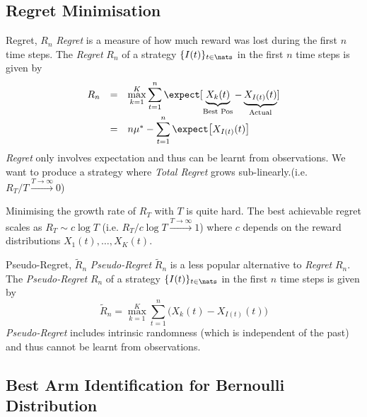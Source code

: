\documentclass[11pt,a4paper]{article}
\begin{document}
\subsection{Regret Minimisation}

  \begin{definition}{Regret, $R_n$}
    \textit{Regret} is a measure of how much reward was lost during the first $n$ time steps. The \textit{Regret} $R_n$ of a strategy $\{I(t)\}_{t\in\nats}$ in the first $n$ time steps is given by
    \[\begin{array}{rcl}
      R_n&=&{\displaystyle \max\limits_{k=1}^K\sum_{t=1}^n \expect[\underbrace{X_k(t)}_\text{Best Pos}-\underbrace{X_{I(t)}(t)}_\text{Actual}]}\\
      &=&n\mu^*-{\displaystyle\sum_{t=1}^n\expect\big[X_{I(t)}(t)\big]}
    \end{array}\]
    \textit{Regret} only involves expectation and thus can be learnt from observations. We want to produce a strategy where \textit{Total Regret} grows sub-linearly.(i.e. $R_T/T\overset{T\to\infty}\longrightarrow0$)
  \end{definition}

  \begin{remark}{Minimising the growth rate of $R_T$ with $T$ is quite hard.}
    The best achievable regret scales as $R_T\sim c\log T$ (i.e. $R_T/c\log T\overset{T\to\infty}\longrightarrow1$) where $c$ depends on the reward distributions $X_1(t),\dots,X_K(t)$.
  \end{remark}

  \begin{definition}{Pseudo-Regret, $\tilde{R}_n$}
    \textit{Pseudo-Regret} $\tilde{R}_n$ is a less popular alternative to \textit{Regret} $R_n$.
    The \textit{Pseudo-Regret} $R_n$ of a strategy $\{I(t)\}_{t\in\nats}$ in the first $n$ time steps is given by
    \[ \tilde{R}_n=\max\limits_{k=1}^K\sum_{t=1}^n\big(X_k(t)-X_{I(t)}(t)\big) \]
    \textit{Pseudo-Regret} includes intrinsic randomness (which is independent of the past) and thus cannot be learnt from observations.
  \end{definition}

\subsection{Best Arm Identification for Bernoulli Distribution}
\end{document}
